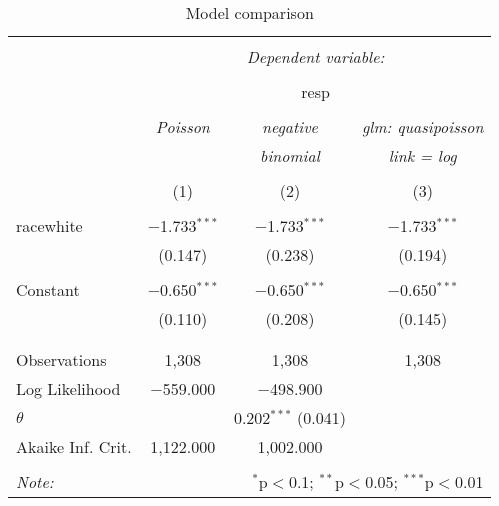 
\begin{wraptable}{r}{4.5in} \centering 
  \caption{Model comparison} 
  \label{} 
\small 
\begin{tabular}{@{\extracolsep{5pt}}lccc} 
\\[-1.8ex]\hline 
\hline \\[-1.8ex] 
 & \multicolumn{3}{c}{\textit{Dependent variable:}} \\ 
\cline{2-4} 
\\[-1.8ex] & \multicolumn{3}{c}{resp} \\ 
\\[-1.8ex] & \textit{Poisson} & \textit{negative} & \textit{glm: quasipoisson} \\ 
 & \textit{} & \textit{binomial} & \textit{link = log} \\ 
\\[-1.8ex] & (1) & (2) & (3)\\ 
\hline \\[-1.8ex] 
 racewhite & $-$1.733$^{***}$ & $-$1.733$^{***}$ & $-$1.733$^{***}$ \\ 
  & (0.147) & (0.238) & (0.194) \\ 
  & & & \\ 
 Constant & $-$0.650$^{***}$ & $-$0.650$^{***}$ & $-$0.650$^{***}$ \\ 
  & (0.110) & (0.208) & (0.145) \\ 
  & & & \\ 
\hline \\[-1.8ex] 
Observations & 1,308 & 1,308 & 1,308 \\ 
Log Likelihood & $-$559.000 & $-$498.900 &  \\ 
$\theta$ &  & 0.202$^{***}$  (0.041) &  \\ 
Akaike Inf. Crit. & 1,122.000 & 1,002.000 &  \\ 
\hline 
\hline \\[-1.8ex] 
\textit{Note:}  & \multicolumn{3}{r}{$^{*}$p$<$0.1; $^{**}$p$<$0.05; $^{***}$p$<$0.01} \\ 
\end{tabular} 
\end{wraptable} 
